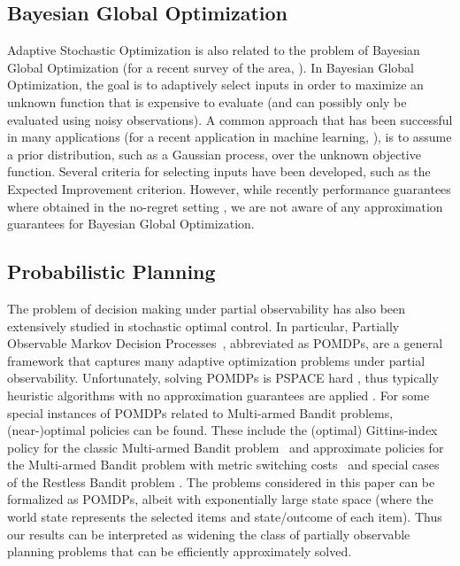 \subsection{Bayesian Global Optimization}
Adaptive Stochastic Optimization is also related to the problem of
Bayesian Global Optimization (for a recent
survey of the area, \cf \cite{nandotut}). In Bayesian Global Optimization, the goal is to
adaptively select inputs in order to maximize an unknown function that
is expensive to evaluate (and can possibly only be evaluated using
noisy observations). A common approach that has been successful in
many applications (for a recent application in machine learning, \cf \cite{lizotte07gait}), is to assume a prior distribution, such as a Gaussian process, over the unknown objective function. Several criteria for selecting inputs have been developed, such as the Expected Improvement \citep{ego98} criterion. However, while recently performance guarantees where obtained in the no-regret setting \citep{gruenewaelder10regret,srinivas10gaussian}, we are not aware of any approximation guarantees for Bayesian Global Optimization.


\subsection{Probabilistic Planning} The problem of decision making
under partial observability has also been extensively studied in
stochastic optimal control. In particular, Partially Observable Markov
Decision Processes~\citep{smallwood73optimal}, abbreviated as POMDPs, are a general framework that captures many adaptive optimization problems under partial observability. Unfortunately, solving POMDPs is PSPACE hard \citep{papadimitriou87complexity}, thus typically heuristic algorithms with no approximation guarantees are applied \citep{pineau06anytime,ross08}.
For some special instances of POMDPs related to Multi-armed Bandit
problems, (near-)optimal policies can be found. These include the
(optimal) Gittins-index policy for the classic Multi-armed Bandit problem~\citep{gittins79dynamic} and approximate policies for the Multi-armed Bandit problem with metric switching costs~\citep{guha09multi} and special cases of the Restless Bandit problem \citep{guha09approximation}. The problems considered in this paper can be formalized as POMDPs, albeit with exponentially large state space (where the world state represents the selected items and state/outcome of each item). Thus our results can be interpreted as widening the class of partially observable planning problems that can be efficiently approximately solved.


